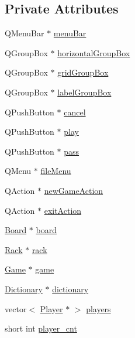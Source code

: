 \subsection*{Private Attributes}
\begin{DoxyCompactItemize}
\item 
Q\-Menu\-Bar $\ast$ \hyperlink{class_dialog_a9712b5e90ad0a47d97d27bb2648e753b}{menu\-Bar}
\item 
Q\-Group\-Box $\ast$ \hyperlink{class_dialog_a382454f1112e8cf8823979456823e9fc}{horizontal\-Group\-Box}
\item 
Q\-Group\-Box $\ast$ \hyperlink{class_dialog_a93c838af40eaab2aecbc11f4ec2f3680}{grid\-Group\-Box}
\item 
Q\-Group\-Box $\ast$ \hyperlink{class_dialog_a93ffff453dba285f896156d073d58220}{label\-Group\-Box}
\item 
Q\-Push\-Button $\ast$ \hyperlink{class_dialog_aa353f9ab09ea36fb2fdc5e5964b9b2b4}{cancel}
\item 
Q\-Push\-Button $\ast$ \hyperlink{class_dialog_afda3b2243f835037bfeb1322289e4f5a}{play}
\item 
Q\-Push\-Button $\ast$ \hyperlink{class_dialog_a1296240f36b4a11c4cf70a709aced623}{pass}
\item 
Q\-Menu $\ast$ \hyperlink{class_dialog_a266ec552501a452ce6925589823e8484}{file\-Menu}
\item 
Q\-Action $\ast$ \hyperlink{class_dialog_a8b086eb4a5d1ec32a4ddfc3abe705505}{new\-Game\-Action}
\item 
Q\-Action $\ast$ \hyperlink{class_dialog_abf163ec5a4490e0019241f39e3e81b48}{exit\-Action}
\item 
\hyperlink{class_board}{Board} $\ast$ \hyperlink{class_dialog_a0a45509f1cb59a221eb09f16e1ca4923}{board}
\item 
\hyperlink{class_rack}{Rack} $\ast$ \hyperlink{class_dialog_a717eee5215d28c0f10bde1444cb959ed}{rack}
\item 
\hyperlink{class_game}{Game} $\ast$ \hyperlink{class_dialog_a1b67d47768a815f0b2824957bd955c49}{game}
\item 
\hyperlink{class_dictionary}{Dictionary} $\ast$ \hyperlink{class_dialog_a465c936ff76ad97698bde2a9b065ab65}{dictionary}
\item 
vector$<$ \hyperlink{class_player}{Player} $\ast$ $>$ \hyperlink{class_dialog_a93e79b9554adff375010cc56a29c82b0}{players}
\item 
short int \hyperlink{class_dialog_a5130628f920537a9359fbdc4058af7b7}{player\-\_\-cnt}
\end{DoxyCompactItemize}


